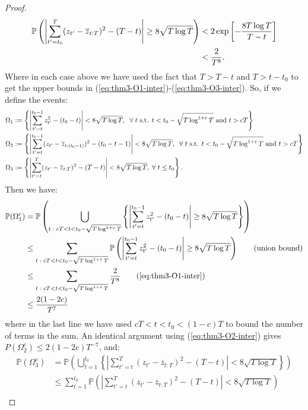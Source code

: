 \begin{proof}
\begin{align}
    \mathbb{P}\left(\left|\sum_{t'=t_0}^T (z_{t'} - \overline{z}_{t:T})^2 - (T-t)\right| \geq 8\sqrt{T\log T}\right)&< 2 \exp\left[- \frac{8 T \log T}{T-t} \right]\notag \\
    &<  \frac{2}{T^8}. \label{eq:thm3-O3-inter}
\end{align}
Where in each case above we have used the fact that $T > T -t$ and $T > t - t_0$ to get the upper bounds in (\ref{eq:thm3-O1-inter})-(\ref{eq:thm3-O3-inter}). So, if we define the events:
\begin{align*}
    \Omega_1 &:= \left\{\left|\sum_{t'=t}^{t_0-1} z^2_{t'} - (t_0 - t)\right| < 8\sqrt{T \log T}, \; \;\forall\; t \text{ s.t. } t < t_0 - \sqrt{T\log^{1+\varepsilon}T} \text{ and } t > cT\right\} \\
    \Omega_2 &:= \left\{\left|\sum_{t'=t}^{t_0-1} (z_{t'} - \overline{z}_{t:(t_0-1)})^2- (t_0 -t - 1)\right| < 8\sqrt{T \log T}, \; \;\forall\; t \text{ s.t. } t < t_0 - \sqrt{T\log^{1+\varepsilon}T} \text{ and } t > cT\right\} \\
    \Omega_3 &:= \left\{\left|\sum_{t'=t}^T (z_{t'} - \overline{z}_{t:T})^2 - (T-t)\right| < 8\sqrt{T \log T}, \;\forall\; t \leq t_0\right\}.
\end{align*}
Then we have:
\begin{align*}
    \mathbb{P}(\Omega^c_1) &= \mathbb{P}\left(\bigcup_{t\;:\; cT < t < t_0 - \sqrt{T\log^{1+\varepsilon}T}} \left\{\left|\sum_{t'=t}^{t_0-1} z^2_{t'} - (t_0 -t)\right| \geq 8\sqrt{T \log T}\right\}\right) \\
    &\leq \sum_{t\;:\; cT < t < t_0 - \sqrt{T\log^{1+\varepsilon}T}} \mathbb{P}\left(\left|\sum_{t'=t}^{t_0-1} z^2_{t'} - (t_0 -t)\right| \geq 8\sqrt{T \log T}\right) \tag{union bound}\\
    &\leq \sum_{t\;:\; cT < t < t_0 - \sqrt{T\log^{1+\varepsilon}T}} \frac{2}{T^8} \tag{\ref{eq:thm3-O1-inter}} \\
    &\leq \frac{2(1-2c)}{T^7}
\end{align*}
where in the last line we have used $cT< t < t_0 <(1-c)T$ to bound the number of terms in the sum. An identical argument using (\ref{eq:thm3-O2-inter}) gives $P(\Omega_2^c) \leq 2(1-2c)T^{-7}$, and:
\begin{align*}
    \mathbb{P}(\Omega^c_3) &= \mathbb{P}\left(\bigcup_{t=1}^{t_0} \left\{\left|\sum_{t'=t}^T (z_{t'} - \overline{z}_{t:T})^2 - (T-t)\right| < 8\sqrt{T \log T}\right\}\right) \\
    &\leq \sum_{t=1}^{t_0} \mathbb{P}\left(\left|\sum_{t'=t}^T (z_{t'} - \overline{z}_{t:T})^2 - (T-t)\right| < 8\sqrt{T \log T}\right) \tag{union bound}\\

\end{align*}
\end{proof}
